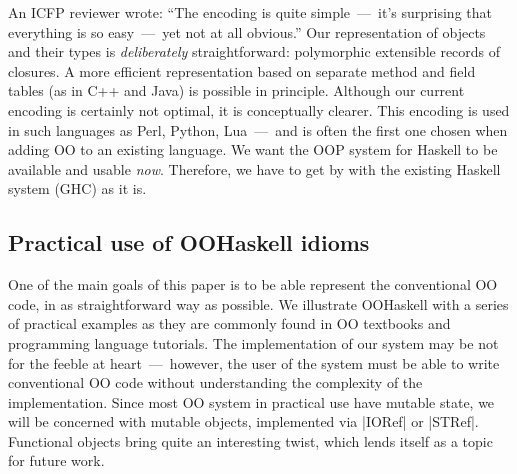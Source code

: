 An ICFP reviewer wrote: ``The encoding is quite simple~---~it's
surprising that everything is so easy~---~yet not at all obvious.''
Our representation of objects and their types is \emph{deliberately}
straightforward: polymorphic extensible records of closures. A more
efficient representation based on separate method and field tables (as
in C++ and Java) is possible in principle. Although our current
encoding is certainly not optimal, it is conceptually clearer. This
encoding is used in such languages as Perl, Python, Lua~---~and is
often the first one chosen when adding OO to an existing language. We
want the OOP system for Haskell to be available and usable
\emph{now}. Therefore, we have to get by with the existing Haskell
system (GHC) as it is.






\subsection{Practical use of OOHaskell idioms}

One of the main goals of this paper is to be able represent the
conventional OO code, in as straightforward way as possible.  We
illustrate OOHaskell with a series of practical examples as they are
commonly found in OO textbooks and programming language tutorials.
The implementation of our system may be not for the feeble at
heart~---~however, the user of the system must be able to write
conventional OO code without understanding the complexity of the
implementation.  Since most OO system in practical use have mutable
state, we will be concerned with mutable objects, implemented via
|IORef| or |STRef|. Functional objects bring quite an interesting
twist, which lends itself as a topic for future work.






